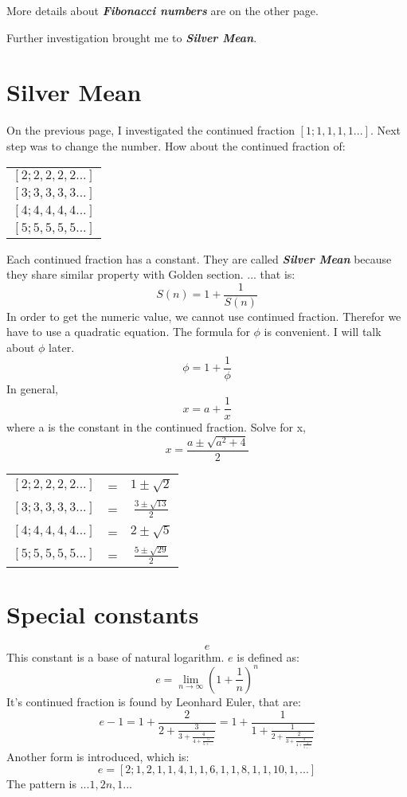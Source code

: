 \documentclass{jreport}
\begin{document}
More details about \textbf{\textit{Fibonacci numbers}} are on the other page.

Further investigation brought me to \textbf{\textit{Silver Mean}}.

\pagebreak

\section*{Silver Mean}

On the previous page, I investigated the continued fraction $[1;1,1,1,1...]$. Next step was to change the number. How about the continued fraction of:
\begin{table}[htbp]
\begin{center}
\begin{tabular}{|l|}
\hline
$[2;2,2,2,2...]$\\
$[3;3,3,3,3...]$\\
$[4;4,4,4,4...]$\\
$[5;5,5,5,5...]$\\
\hline
\end{tabular}
\end{center}
\end{table}

Each continued fraction has a constant. They are called \textbf{\textit{Silver Mean}} because they share similar property with Golden section. ... that is:
\[S(n)=1+\frac{1}{S(n)}\]
In order to get the numeric value, we cannot use continued fraction. Therefor we have to use a quadratic equation. The formula for $\phi$ is convenient. I will talk about $\phi$ later.
\[\phi=1+\frac{1}{\phi}\]
In general,
\[x=a+\frac{1}{x}\]
where a is the constant in the continued fraction. Solve for x,
\[x=\frac{a\pm \sqrt{a^2+4}}{2}\]
\begin{table}[htbp]
\begin{center}
\begin{tabular}{|lcc|}
\hline
$[2;2,2,2,2...]$ & = & $1\pm \sqrt{2}$\\
$[3;3,3,3,3...]$ & = & $\frac{3\pm \sqrt{13}}{2}$\\
$[4;4,4,4,4...]$ & = & $2\pm \sqrt{5}$\\
$[5;5,5,5,5...]$ & = & $\frac{5\pm \sqrt{29}}{2}$\\
\hline
\end{tabular}
\end{center}
\end{table}

\pagebreak

\section*{Special constants}
\[e\]
This constant is a base of natural logarithm. $e$ is defined as:
\[e=\lim_{n\rightarrow \infty}{(1+\frac{1}{n})}^n\]
It's continued fraction is found by Leonhard Euler, that are:
\[e-1=1+\frac{2}{2+\frac{3}{3+\frac{4}{4+\frac{5}{5+...}}}}=1+\frac{1}{1+\frac{1}{2+\frac{2}{3+\frac{3}{4+\frac{4}{5+...}}}}}\]
Another form is introduced, which is:
\[e=[2;1,2,1,1,4,1,1,6,1,1,8,1,1,10,1,...]\]
The pattern is $...1,2n,1...$
\end{document}
